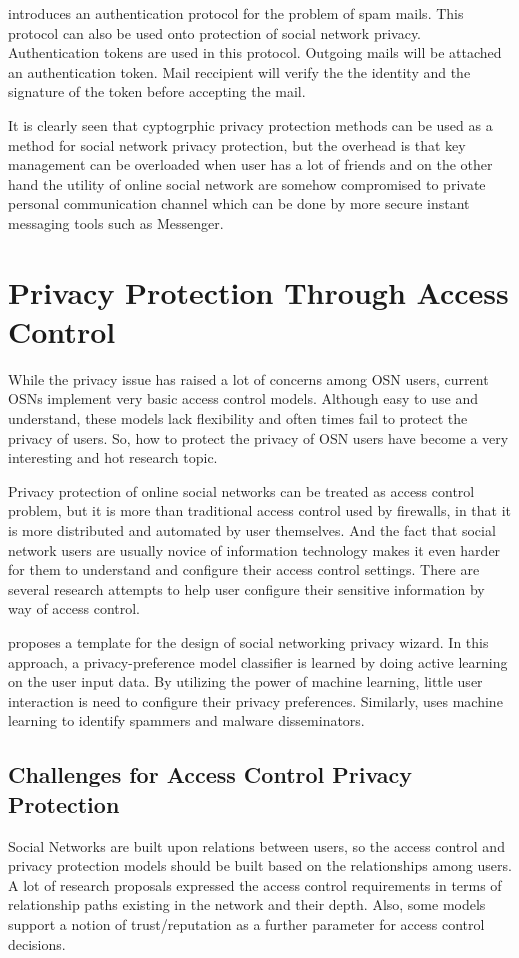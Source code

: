 \documentclass[12pt]{article}
\begin{document}
\cite{reliable_email} introduces an authentication protocol for the
problem of spam mails. This protocol can also be used onto protection
of social network privacy. Authentication tokens are used in this
protocol. Outgoing mails will be attached an authentication
token. Mail reccipient will verify the the identity and the signature
of the token before accepting the mail.

It is clearly seen that cyptogrphic privacy protection methods can be
used as a method for social network privacy protection, but the
overhead is that key management can be overloaded when user has a lot
of friends and on the other hand the utility of online social network
are somehow compromised to private personal communication channel
which can be done by more secure instant messaging tools such as
Messenger. 

\section{Privacy Protection Through Access Control \label{sec:accon}}
While the privacy issue has raised a lot of concerns among OSN users,
current OSNs implement very basic access control models. Although easy
to use and understand, these models lack flexibility and often times
fail to protect the privacy of users. So, how to protect the privacy
of OSN users have become a very interesting and hot research topic.

Privacy protection of online social networks can be treated as access
control problem, but it is more than traditional access control used
by firewalls, in that it is more distributed and automated by user
themselves. And the fact\cite{facebook-privacy-settings} that social
network users are usually novice of information technology makes it
even harder for them to understand and configure their access control
settings. There are several research attempts to help user configure
their sensitive information by way of access control.

\cite{privacy-wizard} proposes a template for the design of social
networking privacy wizard. In this approach, a privacy-preference
model classifier is learned by doing active learning on the user input
data. By utilizing the power of machine learning, little user
interaction is need to configure their privacy preferences. Similarly,
\cite{social-spammer-machine-learning} uses machine learning to
identify spammers and malware disseminators. 

\subsection{Challenges for Access Control Privacy Protection}
Social Networks are built upon relations between users, so the access
control and privacy protection models should be built based on the
relationships among users. A lot of research proposals expressed the
access control requirements in terms of relationship paths existing in
the network and their depth. Also, some models support a notion of
trust/reputation as a further parameter for access control decisions.
\end{document}

